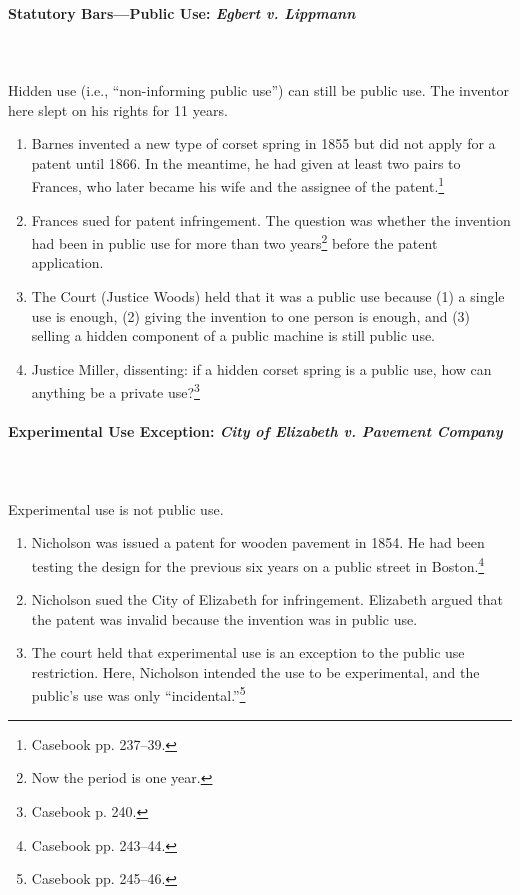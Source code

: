 \paragraph{Statutory Bars---Public Use: \emph{Egbert v. Lippmann}}
~\\\\
Hidden use (i.e., ``non-informing public use'') can still be public use. The 
inventor here slept on his rights for 11 years.

\begin{enumerate}
    \item Barnes invented a new type of corset spring in 1855 but did not apply 
    for a patent until 1866. In the meantime, he had given at least two pairs to 
    Frances, who later became his wife and the assignee of the 
    patent.\footnote{Casebook pp. 237--39.}
    \item Frances sued for patent infringement. The question was whether the 
    invention had been in public use for more than two years\footnote{Now the 
    period is one year.} before the patent application.
    \item The Court (Justice Woods) held that it was a public use because (1) a 
    single use is enough, (2) giving the invention to one person is enough, and 
    (3) selling a hidden component of a public machine is still public use.
    \item Justice Miller, dissenting: if a hidden corset spring is a public use, 
    how can anything be a private use?\footnote{Casebook p. 240.}
\end{enumerate}

\paragraph{Experimental Use Exception: \emph{City of Elizabeth v. Pavement 
Company}}
~\\\\
Experimental use is not public use.

\begin{enumerate}
    \item Nicholson was issued a patent for wooden pavement in 1854. He had been 
    testing the design for the previous six years on a public street in 
    Boston.\footnote{Casebook pp. 243--44.}
    \item Nicholson sued the City of Elizabeth for infringement. Elizabeth 
    argued that the patent was invalid because the invention was in public use.
    \item The court held that experimental use is an exception to the public use 
    restriction. Here, Nicholson intended the use to be experimental, and the 
    public's use was only ``incidental.''\footnote{Casebook pp. 245--46.}
\end{enumerate}

